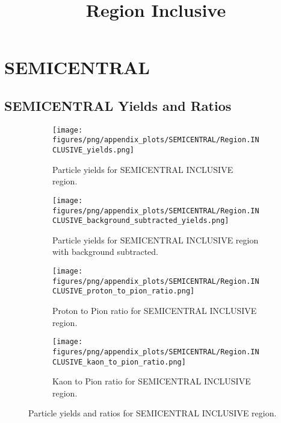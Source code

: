     
        \section{SEMICENTRAL}
        
                \subsection*{SEMICENTRAL Yields and Ratios}
                \begin{figure}[H]
                    \title{Region Inclusive}
                    \begin{subfigure}[b]{0.5\textwidth}
                        \centering
                        \texttt{[image: figures/png/appendix\_plots/SEMICENTRAL/Region.INCLUSIVE\_yields.png]}
                        \caption{Particle yields for SEMICENTRAL INCLUSIVE region.}
                        \label{fig:appendix_SEMICENTRAL_INCLUSIVE_Inclusive_Yields}
                    \end{subfigure}
                    \begin{subfigure}[b]{0.5\textwidth}
                        \centering
                        \texttt{[image: figures/png/appendix\_plots/SEMICENTRAL/Region.INCLUSIVE\_background\_subtracted\_yields.png]}
                        \caption{Particle yields for SEMICENTRAL INCLUSIVE region with background subtracted.}
                        \label{fig:appendix_SEMICENTRAL_INCLUSIVE_Inclusive_Yields_Background_Subtracted}
                    \end{subfigure}
                    \begin{subfigure}[b]{0.5\textwidth}
                        \centering
                        \texttt{[image: figures/png/appendix\_plots/SEMICENTRAL/Region.INCLUSIVE\_proton\_to\_pion\_ratio.png]}
                        \caption{Proton to Pion ratio for SEMICENTRAL INCLUSIVE region.}
                        \label{fig:appendix_SEMICENTRAL_INCLUSIVE_Proton_to_Pion_Ratio}
                    \end{subfigure}
                    \begin{subfigure}[b]{0.5\textwidth}
                        \centering
                        \texttt{[image: figures/png/appendix\_plots/SEMICENTRAL/Region.INCLUSIVE\_kaon\_to\_pion\_ratio.png]}
                        \caption{Kaon to Pion ratio for SEMICENTRAL INCLUSIVE region.}
                        \label{fig:appendix_SEMICENTRAL_INCLUSIVE_Kaon_to_Pion_Ratio}
                    \end{subfigure}
                    \caption{Particle yields and ratios for SEMICENTRAL INCLUSIVE region.}
                    \label{fig:appendix_SEMICENTRAL_INCLUSIVE_Inclusive_Yields_and_Ratios}
                \end{figure}
